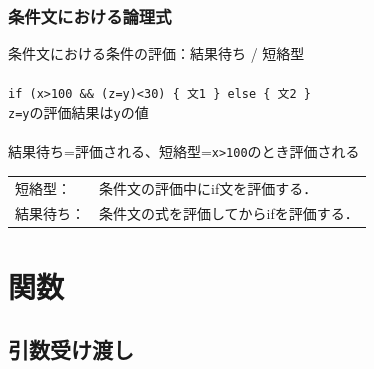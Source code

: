 \documentclass[dvipdfmx]{beamer}
\begin{document}
\begin{frame}[fragile]
  \frametitle{条件文における論理式}
  条件文における条件の評価：結果待ち / 短絡型\\
  \\
  \texttt{if (x>100 \&\& (z=y)<30) \{ 文1 \} else \{ 文2 \}}\\
  \texttt{z=y}の評価結果は\texttt{y}の値\\
  \\
  結果待ち=評価される、短絡型=\texttt{x>100}のとき評価される\\

  \begin{tabular}{ll}
    短絡型：  & 条件文の評価中にif文を評価する．    \\
    結果待ち： & 条件文の式を評価してからifを評価する．
  \end{tabular}



\end{frame}

\section{関数}

\subsection{引数受け渡し}
\end{document}
